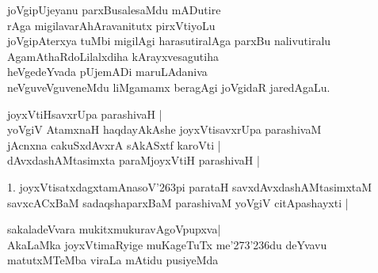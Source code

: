 \begin{entry}
\begin{shl}
joVgipUjeyanu parxBusalesaMdu mADutire\\
rAga migilavarAhAravanitutx pirxVtiyoLu\\
joVgipAterxya tuMbi migilAgi harasutiralAga parxBu nalivutiralu\\
AgamAthaRdoLilalxdiha kArayxvesagutiha\\
heVgedeYvada pUjemADi maruLAdaniva\\
neVguveVguveneMdu liMgamamx beragAgi joVgidaR jaredAgaLu.
\end{shl}
\end{entry}

\begin{entry}
\end{entry}

\begin{entry}
\gl{}
\info{}{}{}{}
\begin{shl}
joyxVtiHsavxrUpa parashivaH |\\
yoVgiV AtamxnaH haqdayAkAshe joyxVtisavxrUpa parashivaM\\
jAcnxna cakuSxdAvxrA sAkASxtf karoVti |\\
dAvxdashAMtasimxta paraMjoyxVtiH parashivaH |
\end{shl}
\begin{shl}
1. joyxVtisatxdagxtamAnasoV\char'263pi parataH savxdAvxdashAMtasimxtaM\\
savxcACxBaM sadaqshaparxBaM parashivaM yoVgiV citApashayxti |
\end{shl}
\end{entry}

\begin{entry}
\end{entry}

\begin{entry}
\gl{}
\begin{shl}
sakaladeVvara mukitxmukuravAgoVpupxva|\\
AkaLaMka joyxVtimaRyige muKageTuTx me\char'273\char'236du deYvavu matutxMTeMba viraLa mAtidu pusiyeMda
\end{shl}
\end{entry}

